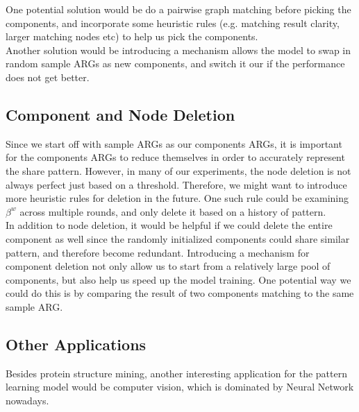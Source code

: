 One potential solution would be do a pairwise graph matching before picking the components, and incorporate some heuristic rules (e.g. matching result clarity, larger matching nodes etc) to help us pick the components.\\

Another solution would be introducing a mechanism allows the model to swap in random sample ARGs as new components, and switch it our if the performance does not get better.

\subsection{Component and Node Deletion}

Since we start off with sample ARGs as our components ARGs, it is important for the components ARGs to reduce themselves in order to accurately represent the share pattern. However, in many of our experiments, the node deletion is not always perfect just based on a threshold. Therefore, we might want to introduce more heuristic rules for deletion in the future. One such rule could be examining $\beta^w$ across multiple rounds, and only delete it based on a history of pattern.\\

In addition to node deletion, it would be helpful if we could delete the entire component as well since the randomly initialized components could share similar pattern, and therefore become redundant. Introducing a mechanism for component deletion not only allow us to start from a relatively large pool of components, but also help us speed up the model training. One potential way we could do this is by comparing the result of two components matching to the same sample ARG.

\subsection{Other Applications}

Besides protein structure mining, another interesting application for the pattern learning model would be computer vision, which is dominated by Neural Network nowadays.\\


